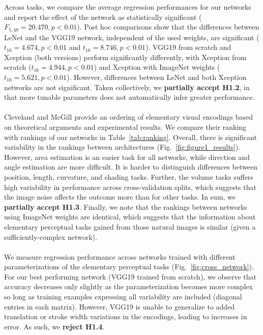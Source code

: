 Across tasks, we compare the average regression performances for our networks and report the effect of the network as statistically significant ($F_{5,48}=20.470,p<0.01$). Post hoc comparisons show that the differences between LeNet and the VGG19 network, independent of the used weights, are significant ($t_{16}=4.674,p<0.01$ and $t_{16}=8.746,p<0.01$). VGG19 from scratch and Xception (both versions) perform significantly differently, with Xception from scratch ($t_{16}=4.944,p<0.01$) and Xception with ImageNet weights ($t_{16}=5.621,p<0.01$). However, differences between LeNet and both Xception networks are not significant. Taken collectively, we \textbf{partially accept H1.2}, in that more tunable parameters does not automatically infer greater performance.
\\~\\
 Cleveland and McGill provide an ordering of elementary visual encodings based on theoretical arguments and experimental results. We compare their ranking with rankings of our networks in Table~\ref{tab:ranking}. Overall, there is significant variability in the rankings between architectures (Fig.~\ref{fig:figure1_results}). However, area estimation is an easier task for all networks, while direction and angle estimation are more difficult. It is harder to distinguish differences between position, length, curvature, and shading tasks. Further, the volume tasks suffers high variability in performance across cross-validation splits, which suggests that the image noise affects the outcome more than for other tasks. In sum, we \textbf{partially accept H1.3}. Finally, we note that the rankings between networks using ImageNet weights are identical, which suggests that the information about elementary perceptual tasks gained from those natural images is similar (given a sufficiently-complex network).
\\~\\
 We measure regression performance across networks trained with different parameterizations of the elementary perceptual tasks (Fig.~\ref{fig:cross_network}). For our best performing network (VGG19 trained from scratch), we observe that accuracy decreases only slightly as the parameterization becomes more complex so long as training examples expressing all variability are included (diagonal entries in each matrix).  However, VGG19 is unable to generalize to added translation or stroke width variations in the encodings, leading to increases in error. As such, we \textbf{reject H1.4}. 

